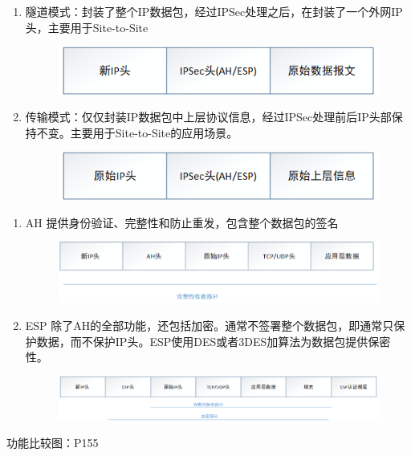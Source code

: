 \begin{enumerate}
	\item 隧道模式：封装了整个IP数据包，经过IPSec处理之后，在封装了一个外网IP头，主要用于Site-to-Site
	\begin{figure}[H]
		\centering
		\includegraphics[width=0.7\linewidth]{figures/screenshot002}
		\caption{}
		\label{fig:screenshot002}
	\end{figure}
	
	\item 传输模式：仅仅封装IP数据包中上层协议信息，经过IPSec处理前后IP头部保持不变。主要用于Site-to-Site的应用场景。
	\begin{figure}
		\centering
		\includegraphics[width=0.7\linewidth]{figures/screenshot003}
		\caption{}
		\label{fig:screenshot003}
	\end{figure}
	
\end{enumerate}


\begin{enumerate}
	\item AH 提供身份验证、完整性和防止重发，包含整个数据包的签名
	\begin{figure}[H]
		\centering
		\includegraphics[width=0.7\linewidth]{figures/screenshot004}
		\caption{}
		\label{fig:screenshot004}
	\end{figure}
	\item ESP 除了AH的全部功能，还包括加密。通常不签署整个数据包，即通常只保护数据，而不保护IP头。ESP使用DES或者3DES加算法为数据包提供保密性。
	\begin{figure}[H]
		\centering
		\includegraphics[width=0.8\linewidth]{figures/screenshot005}
		\caption{}
		\label{fig:screenshot005}
	\end{figure}
\end{enumerate}
 功能比较图：P155
 
